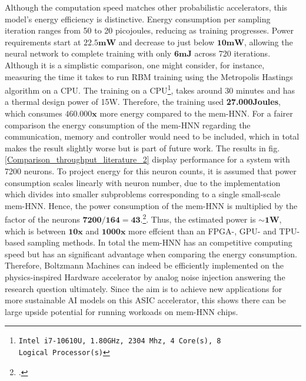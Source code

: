 Although the computation speed matches other probabilistic accelerators, this model's energy efficiency is distinctive.
Energy consumption per sampling iteration ranges from 50 to 20 picojoules, reducing as training progresses.
Power requirements start at \(\mathbf{22.5mW}\) and decrease to just below \(\mathbf{10mW}\), allowing the neural network to complete training with only 
\(\mathbf{6 mJ}\) across 720 iterations.
Although it is a simplistic comparison, one might consider, for instance, measuring the time it takes to run RBM training using the Metropolis Hastings algorithm on a \ac{CPU}.
The training on a CPU\footnote{\texttt{Intel i7-10610U, 1.80GHz, 2304 Mhz, 4 Core(s), 8 Logical Processor(s)}}, takes around 30 minutes and has a thermal design power of 15W.
Therefore, the training used \textbf{27.000Joules}, which consumes \(\mathbf{460.000x}\) more energy compared to the \ac{mem-HNN}.
For a fairer comparison the energy consumption of the \ac{mem-HNN} regarding the communication, memory and controller would need to be included, which 
in total makes the result slightly worse but is part of future work. 
The results in fig.\ref{Comparison_throughput_literature_2} display performance for a system with 7200 neurons.
To project energy for this neuron counts, it is assumed that power consumption scales linearly with neuron number, due to the implementation which divides into smaller subproblems corresponding to a single small-scale \ac{mem-HNN}.
Hence, the power consumption of the \ac{mem-HNN} is multiplied by the factor of the neurons \(\mathbf{7200/164=43}\).\footcite[cf.][2]{aaditAcceleratingAdaptiveParallel2023}.
Thus, the estimated power is \(\mathbf{\sim1W}\), which is between \(\mathbf{10x}\) and \(\mathbf{1000x}\) more effcient than an FPGA-, GPU- and TPU-based sampling methods.
In total the \ac{mem-HNN} has an competitive computing speed but has an significant advantage when comparing the energy consumption.
Therefore, Boltzmann Machines can indeed be efficiently implemented on the physics-inspired Hardware accelerator by analog noise injection answering the research question ultimately. 
Since the aim is to achieve new applications for more sustainable AI models on this \ac{ASIC} accelerator, 
this shows there can be large upside potential for running workoads on \ac{mem-HNN} chips.

